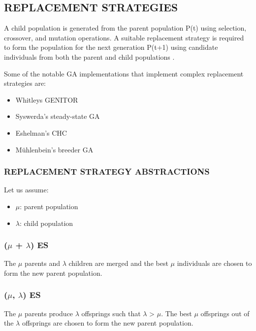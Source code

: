 \documentclass[12pt,a4paper]{article}
\begin{document}
	\subsection{REPLACEMENT STRATEGIES} 
	A child population is generated from the parent population P(t) using selection, crossover, and mutation operations. A suitable replacement strategy is required to form the population for the next generation P(t+1) using candidate individuals from both the parent and child populations \cite{handbook}. 
	
	Some of the notable GA implementations that implement complex replacement strategies are:
	\begin{itemize}
	\item Whitleys GENITOR
	\item Syswerda’s steady-state GA
	\item Eshelman’s CHC
	\item Mühlenbein’s breeder GA
	\end{itemize}
	
	\subsubsection{REPLACEMENT STRATEGY ABSTRACTIONS}
	Let us assume:
	\begin{itemize}
	\item $\mu$: parent population
	\item $\lambda$: child population
	\end{itemize}
	
	\subsubsection{($\mu$ + $\lambda$) ES}
	The $\mu$ parents and $\lambda$ children are merged and the best $\mu$ individuals are chosen to form the new parent population.
	
	\subsubsection{($\mu$, $\lambda$) ES}
	The $\mu$ parents produce $\lambda$ offsprings such that $\lambda$ > $\mu$. The best $\mu$ offsprings out of the $\lambda$ offsprings are chosen to form the new parent population.
	
\end{document}
